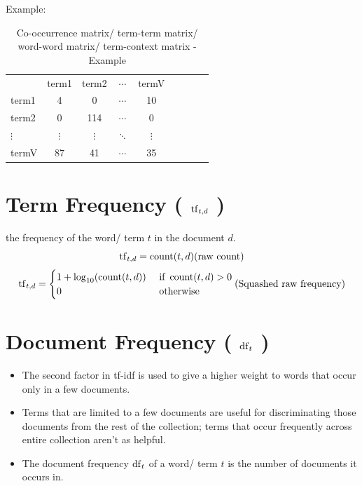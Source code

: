 Example:
\begin{table}[h]
    \centering
    \begin{tabular}{l c c c c c c c c}
         & term1 & term2 & $\cdots$ & termV \\
        term1 & 4 & 0 & $\cdots$ & 10 \\ 
        term2 & 0 & 114 & $\cdots$ & 0 \\ 
        $\vdots$ & $\vdots$ & $\vdots$ & $\ddots$ & $\vdots$ \\
        termV & 87 & 41 & $\cdots$ & 35 \\ 
    \end{tabular}
    \caption{Co-occurrence matrix/ term-term matrix/ word-word matrix/ term-context matrix - Example}
\end{table}

\section{Term Frequency ( $\operatorname{tf}_{t,d}$ ) \cite{nlp-1}} \label{Term Frequency}

the frequency of the word/ term $t$ in the document $d$.
\[
    \rcmdXtf_{t,d} = \rcmdXcount(t,d) \hfill \text{(raw count)}
\]
\[
    \rcmdXtf_{t,d} = \begin{cases}
        1 + \log_{10}(\rcmdXcount(t,d)) & \text{ if } \rcmdXcount(t,d) > 0\\
        0 & \text{ otherwise}
    \end{cases} \hfill \text{(Squashed raw frequency)}
\]


\section{Document Frequency ( $\operatorname{df}_t$ ) \cite{nlp-1}}\label{Document Frequency}

\begin{itemize}
    \item The second factor in tf-idf is used to give a higher weight to words that occur only in a few documents.

    \item Terms that are limited to a few documents are useful for discriminating those documents from the rest of the collection; terms that occur frequently across entire collection aren't as helpful.

    \item The document frequency $\operatorname{df}_t$ of a word/ term $t$ is the number of documents it occurs in.
\end{itemize}

